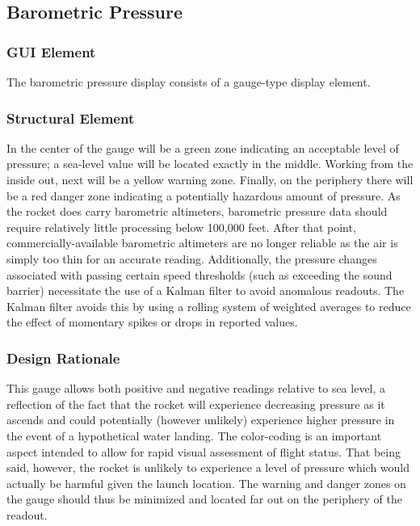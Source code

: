 \documentclass[journal,10pt,onecolumn,compsoc]{IEEEtran}
\begin{document}
	\subsection{Barometric Pressure}

		\subsubsection{GUI Element}
			The barometric pressure display consists of a gauge-type display element.
					
		\subsubsection{Structural Element}
			In the center of the gauge will be a green zone indicating an acceptable level of pressure; a sea-level value will be located exactly in the middle.
			Working from the inside out, next will be a yellow warning zone.
			Finally, on the periphery there will be a red danger zone indicating a potentially hazardous amount of pressure.
			As the rocket does carry barometric altimeters, barometric pressure data should require relatively little processing below 100,000 feet.
			After that point, commercially-available barometric altimeters are no longer reliable as the air is simply too thin for an accurate reading.
			Additionally, the pressure changes associated with passing certain speed thresholds (such as exceeding the sound barrier) necessitate the use of a Kalman filter to avoid anomalous readouts.
			The Kalman filter avoids this by using a rolling system of weighted averages to reduce the effect of momentary spikes or drops in reported values.
			
		\subsubsection{Design Rationale}
			This gauge allows both positive and negative readings relative to sea level, a reflection of the fact that the rocket will experience decreasing pressure as it ascends and could potentially (however unlikely) experience higher pressure in the event of a hypothetical water landing.
			The color-coding is an important aspect intended to allow for rapid visual assessment of flight status.
			That being said, however, the rocket is unlikely to experience a level of pressure which would actually be harmful given the launch location.
			The warning and danger zones on the gauge should thus be minimized and located far out on the periphery of the readout.
\end{document}
